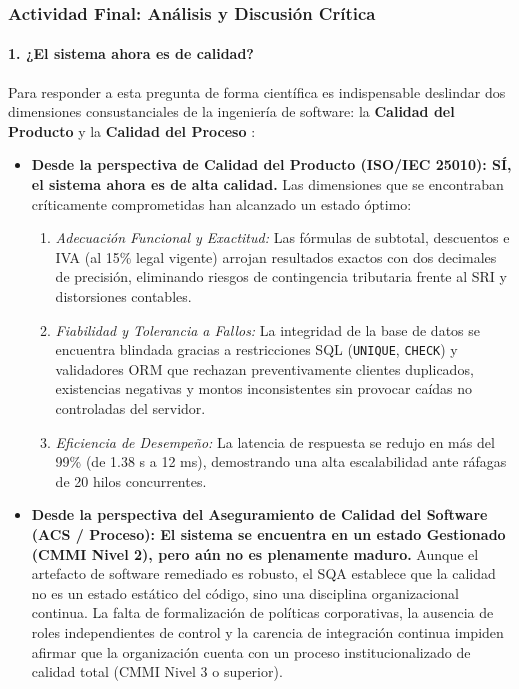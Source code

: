 \documentclass{article}
\begin{document}
\newpage

\subsubsection{Actividad Final: Análisis y Discusión Crítica}

\paragraph{1. ¿El sistema ahora es de calidad?}
Para responder a esta pregunta de forma científica es indispensable deslindar dos dimensiones consustanciales de la ingeniería de software: la \textbf{Calidad del Producto} y la \textbf{Calidad del Proceso} \cite{iso25010, iso12207, pressman2014}:
\begin{itemize}
    \item \textbf{Desde la perspectiva de Calidad del Producto (ISO/IEC 25010): SÍ, el sistema ahora es de alta calidad.} 
    Las dimensiones que se encontraban críticamente comprometidas han alcanzado un estado óptimo:
    \begin{enumerate}
        \item \textit{Adecuación Funcional y Exactitud:} Las fórmulas de subtotal, descuentos e IVA (al 15\% legal vigente) arrojan resultados exactos con dos decimales de precisión, eliminando riesgos de contingencia tributaria frente al SRI y distorsiones contables.
        \item \textit{Fiabilidad y Tolerancia a Fallos:} La integridad de la base de datos se encuentra blindada gracias a restricciones SQL (\texttt{UNIQUE}, \texttt{CHECK}) y validadores ORM que rechazan preventivamente clientes duplicados, existencias negativas y montos inconsistentes sin provocar caídas no controladas del servidor.
        \item \textit{Eficiencia de Desempeño:} La latencia de respuesta se redujo en más del 99\% (de 1.38 s a 12 ms), demostrando una alta escalabilidad ante ráfagas de 20 hilos concurrentes.
    \end{enumerate}
    \item \textbf{Desde la perspectiva del Aseguramiento de Calidad del Software (ACS / Proceso): El sistema se encuentra en un estado Gestionado (CMMI Nivel 2), pero aún no es plenamente maduro.} 
    Aunque el artefacto de software remediado es robusto, el SQA establece que la calidad no es un estado estático del código, sino una disciplina organizacional continua. La falta de formalización de políticas corporativas, la ausencia de roles independientes de control y la carencia de integración continua impiden afirmar que la organización cuenta con un proceso institucionalizado de calidad total (CMMI Nivel 3 o superior).
\end{itemize}
\end{document}
